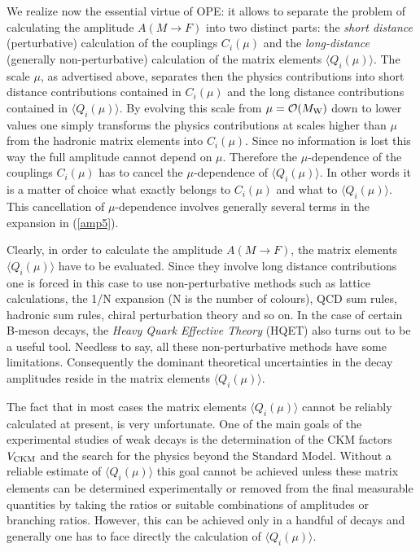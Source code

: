 \documentclass[12pt,rotate]{article}
\newcommand{\mw}{M_{\rm W}}
\newcommand{\ord}{{\cal O}}
\begin{document}
We realize now the essential virtue of OPE: it allows to separate the problem
of calculating the amplitude
$A(M\to F)$ into two distinct parts: the {\it short distance}
(perturbative) calculation of the couplings $C_i(\mu)$ and 
the {\it long-distance} (generally non-perturbative) calculation of 
the matrix elements $\langle Q_i(\mu)\rangle$. The scale $\mu$, as
advertised above, separates then the physics contributions into short
distance contributions contained in $C_i(\mu)$ and the long distance 
contributions
contained in $\langle Q_i(\mu)\rangle$. By evolving this scale from 
$\mu=\ord(\mw)$ down to lower values one
simply transforms the physics contributions at scales higher than $\mu$ 
from the hadronic matrix elements into $C_i(\mu)$. Since no information 
is lost this way the full amplitude cannot depend on $\mu$. Therefore 
the $\mu$-dependence of the couplings $C_i(\mu)$ has to cancel the 
$\mu$-dependence of $\langle Q_i(\mu)\rangle$. In other words it is a
matter of choice what exactly belongs to $C_i(\mu)$ and what to 
$\langle Q_i(\mu)\rangle$. This cancellation
of $\mu$-dependence involves generally several terms in the expansion 
in (\ref{amp5}).

Clearly, in order to calculate the amplitude $A(M\to F)$, the matrix 
elements $\langle Q_i(\mu)\rangle$ have to be evaluated. 
Since they involve long distance contributions one is forced in
this case to use non-perturbative methods such as lattice calculations, the
1/N expansion (N is the number of colours), QCD sum rules, hadronic sum rules,
chiral perturbation theory and so on. In the case of certain B-meson decays,
the {\it Heavy Quark Effective Theory} (HQET) also turns out to be a 
useful tool.
Needless to say, all these non-perturbative methods have some limitations.
Consequently the dominant theoretical uncertainties in the decay amplitudes
reside in the matrix elements $\langle Q_i(\mu)\rangle$.

The fact that in most cases the matrix elements $\langle Q_i(\mu)\rangle$
 cannot be reliably
calculated at present, is very unfortunate. One of the main goals of the
experimental studies of weak decays is the determination of the CKM factors 
$V_{\rm CKM}$
and the search for the physics beyond the Standard Model. Without a reliable
estimate of $\langle Q_i(\mu)\rangle$ this goal cannot be achieved unless 
these matrix elements can be determined experimentally or removed from the 
final measurable quantities
by taking the ratios or suitable combinations of amplitudes or branching
ratios. However, this can be achieved only in a handful of decays and
generally one has to face directly the calculation of 
$\langle Q_i(\mu)\rangle$.
\end{document}
